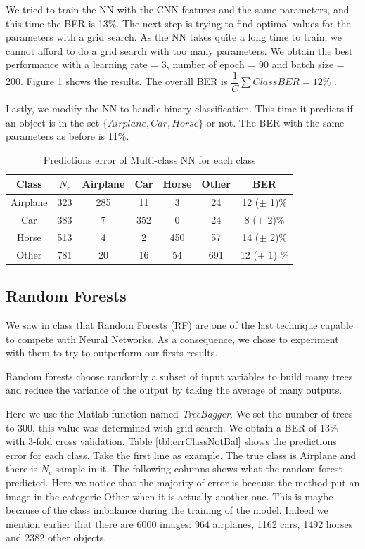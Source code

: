 \documentclass{article} %
\begin{document}
We tried to train the NN with the CNN features and the same parameters, and this time the BER is 13\%.
The next step is trying to find optimal values for the parameters with a grid search. As the NN takes quite a long time to train, we cannot afford to do a grid search with too many parameters.
We obtain the best performance with a learning rate = 3, number of epoch = 90 and batch size = 200. 
Figure \ref{tbl:errClassNN} shows the results. The overall BER is $\dfrac{1}{C}\sum Class BER= 12\%$ . 

Lastly, we modify the NN to handle binary classification. This time it predicts if an object is in the set $\{Airplane, Car, Horse\}$ or not. The BER with the same parameters as before is 11\%.

\begin{table}
	\centering
	\begin{tabular}{|c|c|c|c|c|c|c|}
		\hline Class & $N_{c}$ & Airplane & Car & Horse & Other & BER \\ 
		\hline Airplane	  & 323 & 285 & 11 & 3 & 24 & 12 ($\pm$ 1)\% \\ 
		\hline Car			& 383 & 7 & 352 & 0 & 24 &  8 ($\pm$ 2)\% \\ 
		\hline Horse      & 513 & 4 & 2 & 450 & 57 &  14 ($\pm$ 2)\% \\ 
		\hline Other      & 781 & 20 & 16 & 54 & 691 & 12 ($\pm$ 1) \% \\ 
		\hline 
	\end{tabular} 
	\caption{Predictions error of Multi-class NN for each class}
	\label{tbl:errClassNN}
\end{table}

\subsection{Random Forests}
We saw in class that Random Forests (RF) are one of the last technique capable to compete with Neural Networks.
As a consequence, we chose to experiment with them to try to outperform our firsts results.

Random forests choose randomly a subset of input variables to build many trees and reduce the variance of the output by taking the average of many outputs.

Here we use the Matlab function named \emph{TreeBagger}. We set the number of trees to 300, this value was determined with grid search.
We obtain a BER of 13\% with 3-fold cross validation. Table \ref{tbl:errClassNotBal} shows the predictions error for each class. Take the first line as example. The true class is Airplane and there is $N_c$ sample in it. The following columns shows what the random forest predicted.
Here we notice that the majority of error is because the method put an image in the categorie Other when it is actually another one.
This is maybe because of the class imbalance during the training of the model. Indeed we mention earlier that there are 6000 images: 964 airplanes, 1162 cars, 1492 horses and 2382 other objects.
\end{document}
